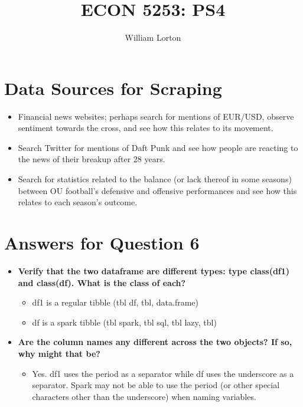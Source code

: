 \documentclass{homeworg}
\title{ECON 5253: PS4}
\author{William Lorton}
\begin{document}
\maketitle

\section{Data Sources for Scraping}

\begin{itemize}
    \item Financial news websites; perhaps search for mentions of EUR/USD, observe sentiment towards the cross, and see how this relates to its movement.
    \item Search Twitter for mentions of Daft Punk and see how people are reacting to the news of their breakup after 28 years.
    \item Search for statistics related to the balance (or lack thereof in some seasons) between OU football's defensive and offensive performances and see how this relates to each season's outcome.
\end{itemize}

\section{Answers for Question 6}

\begin{itemize}
    \item \textbf{Verify that the two dataframe are different types: type class(df1) and class(df). What is the class of each?} 
    \begin{itemize}
        \item df1 is a regular tibble (tbl df, tbl, data.frame)
        \item df is a spark tibble (tbl spark, tbl sql, tbl lazy, tbl)
    \end{itemize}
    \item \textbf{Are the column names any different across the two objects? If so, why might that be?}
        \begin{itemize}
        \item Yes. df1 uses the period as a separator while df uses the underscore as a separator. Spark may not be able to use the period (or other special characters other than the underscore) when naming variables.
    \end{itemize}
\end{itemize}
\end{document}
